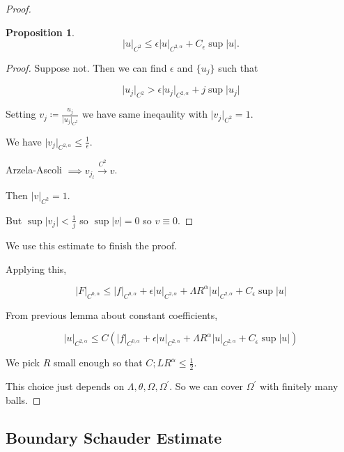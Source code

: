 \documentclass{article}
\theoremstyle{definition}
\newtheorem{proposition}{Proposition}
\begin{document}
\begin{proof}
\begin{proposition}
        \[
            \vert u \vert_{C^2} \leq \epsilon \vert u \vert _{C^{2,\alpha}} + C_{\epsilon} \sup \vert u \vert.
        \]
    \end{proposition}

    \begin{proof}
        Suppose not. Then we can find \(\epsilon\) and \(\{ u_j \}\) such that

        \[
            \vert u_j \vert_{C^2} > \epsilon \vert u_j \vert_{C^{2,\alpha}} + j \sup \vert u_j \vert
        \]

        Setting \(v_j \coloneqq \frac{u_j}{\vert u_j \vert_{C^2}}\) we have same ineqaulity with \(\vert v_j \vert_{C^2} = 1\).

        We have \(\vert v_j \vert_{C^{2,\alpha}} \leq \frac{1}{\epsilon}\).

        Arzela-Ascoli \(\implies v_{j_l} \overset{C^2}{\to} v\).

        Then \(\vert v \vert_{C^2} = 1\).

        But \(\sup \vert v_j \vert < \frac{1}{j}\) so \(\sup \vert v \vert = 0\) so \(v \equiv 0\).


    \end{proof}

    We use this estimate to finish the proof.

    Applying this,

    \[
        \vert F \vert_{C^{0,\alpha}} \leq \vert f \vert _{C^{0,\alpha}} + \epsilon \vert u \vert_{C^{2,\alpha}} + \Lambda R^\alpha \vert u \vert _{C^{2,\alpha}} + C_{\epsilon } \sup \vert u \vert
    \]

    From previous lemma about constant coefficients,
    
    \[
        \vert u \vert_{C^{2,\alpha}} \leq C \left( \vert f \vert_{C^{0,\alpha}} + \epsilon \vert u \vert_{C^{2,\alpha}} + \Lambda R^\alpha \vert u \vert_{C^{2,\alpha}} + C_{\epsilon} \sup \vert u \vert \right)
    \] 

    We pick \(R\) small enough so that \(C;LR^\alpha \leq \frac{1}{2}\).

    This choice just depends on \(\Lambda, \theta, \Omega, \Omega^{\prime}\). So we can cover \(\Omega^{\prime}\) with finitely many balls.

\end{proof}

\subsection*{Boundary Schauder Estimate}
\end{document}
